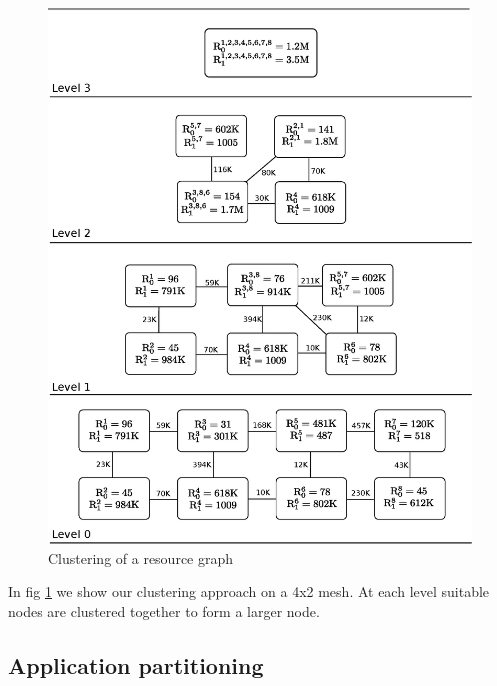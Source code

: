 \begin{figure}[ht]
  \includegraphics[scale=0.43]{./figures/resource}
  \caption{Clustering of a resource graph}
  \label{fig:res}
\end{figure}

In fig \ref{fig:res} we show our clustering approach on a 4x2 mesh. At
each level suitable nodes are clustered together to form a larger node.

\subsection{Application partitioning}
\label{sec:appl-part}
